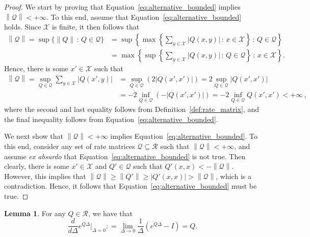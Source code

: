 \documentclass[10pt,a4paper]{paper}
\theoremstyle{definition}
\newtheorem{lemma}[theorem]{Lemma}
\newcommand{\states}{\mathcal{X}}
\newcommand{\rateset}{\mathcal{Q}}
\newcommand{\norm}[1]{\left\lVert #1 \right\rVert}
\newcommand{\abs}[1]{\left\vert #1 \right\vert}
\newcommand{\coloneqq}{:\!=}
\begin{document}
\propalternativedefforbounded*
\begin{proof}
We start by proving that Equation~\eqref{eq:alternative_bounded} implies $\norm{\rateset}<+\infty$. 
 To this end, assume that Equation~\eqref{eq:alternative_bounded} holds. Since $\states$ is finite, it then follows that
\begin{align*}
\norm{\rateset} = \sup\{\norm{Q}\,:\,Q\in\rateset\}
 &= \sup\left\{\max\left\{\sum_{y\in\states}\abs{Q(x,y)}\,:\,x\in\states\right\}\,:\,Q\in\rateset\right\} \\
 &= \max\left\{\sup\left\{\sum_{y\in\states}\abs{Q(x,y)}\,:\,Q\in\rateset\right\} \,:\,x\in\states\right\}.
\end{align*}Hence, there is some $x'\in\states$ such that
\begin{align*}
\norm{\rateset} = \sup_{Q\in\rateset}\sum_{y\in\states}\abs{Q(x',y)}
&=\sup_{Q\in\rateset}\left(2\abs{Q(x',x')}\right)
 = 2\sup_{Q\in\rateset}\abs{Q(x',x')}\\
 &= -2\inf_{Q\in\rateset}\left(-\abs{Q(x',x')}\right)
 = -2\inf_{Q\in\rateset}Q(x',x')< +\infty\,,
\end{align*}
where the second and last equality follows from Definition~\ref{def:rate_matrix}, and the final inequality follows from Equation~\eqref{eq:alternative_bounded}.

We next show that $\norm{\rateset}<+\infty$ implies Equation~\eqref{eq:alternative_bounded}. To this end, consider any set of rate matrices $\rateset\subseteq\mathcal{R}$ such that $\norm{\rateset}<+\infty$, and assume \emph{ex absurdo} that Equation~\eqref{eq:alternative_bounded} is not true. Then clearly, there is some $x'\in\states$ and $Q'\in\rateset$ such that $Q'(x,x)<-\norm{\rateset}$. However, this implies that $\norm{\rateset}\geq\norm{Q'}\geq\abs{Q'(x,x)}>\norm{\rateset}$, which is a contradiction. Hence, it follows that Equation~\eqref{eq:alternative_bounded} must be true.
\end{proof}

\begin{lemma}{\cite[Theorem 2.1.1]{norris1998markov}}\label{lemma:deriv_exponential_trans}
For any $Q\in\mathcal{R}$, we have that
\begin{equation*}
{\frac{d}{d \Delta}e^{Q\Delta}}\big\vert_{\Delta=0} \coloneqq \lim_{\Delta\to 0}\frac{1}{\Delta}(e^{Q\Delta}-I)= Q.
\end{equation*}
\end{lemma}
\end{document}
